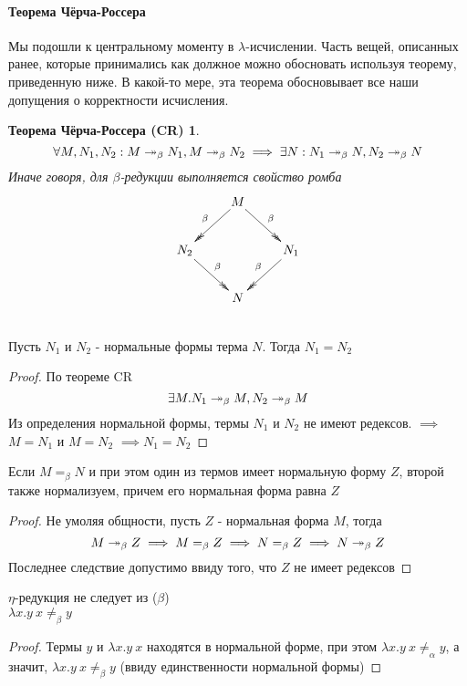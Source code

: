 \documentclass[lambda.tex]{subfiles}
\begin{document}
\begin{tcolorbox}
	\paragraph{Теорема Чёрча-Россера} %
	\label{par:Church-Rosser}
	Мы подошли к центральному моменту в $\lambda$-исчислении. Часть вещей, описанных ранее, которые принимались как должное можно обосновать используя теорему, приведенную ниже. В какой-то мере, эта теорема обосновывает все наши допущения о корректности исчисления.
	\newtheorem*{churchrosser}{Теорема Чёрча-Россера (CR)}
	\begin{churchrosser}
		$$
		\forall M,N_1,N_2:M
		\twoheadrightarrow_\beta N_1, M
		\twoheadrightarrow_\beta N_2
		\implies
		\exists N : N_1
		\twoheadrightarrow_\beta N,N_2
		\twoheadrightarrow_\beta N
		$$
		Иначе говоря, для $\beta$-редукции выполняется свойство ромба
		\begin{align*}
			\xymatrix{
			& \ar@{->>}[dl]_\beta M \ar@{->>}[dr]^\beta \\
			N_2 \ar@{->>}[dr]^\beta & & N_1 \ar@{->>}[dl]_\beta \\
			&N
		}
		\end{align*}
	\end{churchrosser}


	\begin{corollary}
		~\\
		Пусть $N_1$ и $N_2$ - нормальные формы терма $N$. Тогда $N_1 = N_2$ 
	\end{corollary}
	\begin{proof}
		По теореме CR $$\exists M.N_1 \twoheadrightarrow_\beta M, N_2 \twoheadrightarrow_\beta M$$
		Из определения нормальной формы, термы $N_1$ и $N_2$ не имеют редексов.
		$\implies$ $M=N_1$ и $M=N_2$ $\implies N_1 = N_2$
	\end{proof}
	\begin{corollary}
		Если $M =_\beta N$ и при этом один из термов имеет нормальную форму $Z$, второй также нормализуем, причем его нормальная форма равна $Z$
	\end{corollary}
	\begin{proof}
		Не умоляя общности, пусть $Z$ - нормальная форма $M$, тогда 
		$$M \twoheadrightarrow_\beta Z \implies M =_\beta Z \implies N =_\beta Z \implies N \twoheadrightarrow_\beta Z$$
		Последнее следствие допустимо ввиду того, что $Z$ не имеет редексов
	\end{proof}
	\begin{corollary}
		$\eta$-редукция не следует из ($\beta$)
		~\\
		$\lambda x.y\ x \neq_\beta y$
	\end{corollary}
	\begin{proof}
		Термы $y$ и $\lambda x.y\ x$ находятся в нормальной форме, при этом $\lambda x.y\ x \neq_\alpha y$, а значит, $\lambda x.y\ x \neq_\beta y$ (ввиду единственности нормальной формы)
	\end{proof}
\end{tcolorbox}
\end{document}
